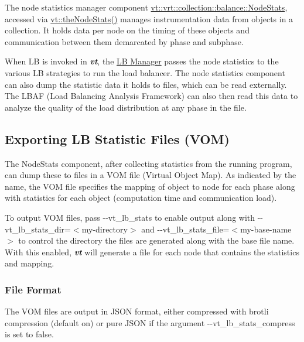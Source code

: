 The node statistics manager component {\ttfamily \hyperlink{structvt_1_1vrt_1_1collection_1_1balance_1_1_node_stats}{vt\+::vrt\+::collection\+::balance\+::\+Node\+Stats}}, accessed via {\ttfamily \hyperlink{namespacevt_ae1526efa346612ad330d9a628e596c54}{vt\+::the\+Node\+Stats()}} manages instrumentation data from objects in a collection. It holds data per node on the timing of these objects and communication between them demarcated by phase and subphase.

When LB is invoked in {\bfseries {\itshape vt}}, the \hyperlink{lb-manager}{LB Manager} passes the node statistics to the various LB strategies to run the load balancer. The node statistics component can also dump the statistic data it holds to files, which can be read externally. The L\+B\+AF (Load Balancing Analysis Framework) can also then read this data to analyze the quality of the load distribution at any phase in the file.\hypertarget{node-stats_export-lb-stats-file}{}\subsection{Exporting L\+B Statistic Files (\+V\+O\+M)}\label{node-stats_export-lb-stats-file}
The {\ttfamily Node\+Stats} component, after collecting statistics from the running program, can dump these to files in a V\+OM file (Virtual Object Map). As indicated by the name, the V\+OM file specifies the mapping of object to node for each phase along with statistics for each object (computation time and communication load).

To output V\+OM files, pass {\ttfamily -\/-\/vt\+\_\+lb\+\_\+stats} to enable output along with {\ttfamily -\/-\/vt\+\_\+lb\+\_\+stats\+\_\+dir=$<$my-\/directory$>$} and {\ttfamily -\/-\/vt\+\_\+lb\+\_\+stats\+\_\+file=$<$my-\/base-\/name$>$} to control the directory the files are generated along with the base file name. With this enabled, {\bfseries {\itshape vt}} will generate a file for each node that contains the statistics and mapping.\hypertarget{node-stats_stats-file-format}{}\subsubsection{File Format}\label{node-stats_stats-file-format}
The V\+OM files are output in J\+S\+ON format, either compressed with brotli compression (default on) or pure J\+S\+ON if the argument {\ttfamily -\/-\/vt\+\_\+lb\+\_\+stats\+\_\+compress} is set to {\ttfamily false}.

